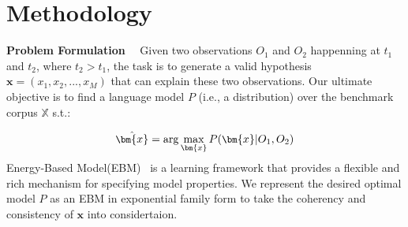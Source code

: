 \section{Methodology}


\noindent \textbf{Problem Formulation} ~~Given two observations $O_1$ and $O_2$ happenning at $t_1$ and $t_2$, where $t_2 > t_1$,
the task is to generate a valid hypothesis $\bm{x} = (x_1, x_2, ..., x_M)$ that can explain these two observations. 
Our ultimate objective is to find a language model $P$ (i.e., a distribution) over the benchmark corpus $\mathbb{X}$ s.t.:

\begin{equation}\label{setting}
    \small
    \hat{\bm{x}} = \arg\max_{\bm{x}}P(\bm{x}|O_1, O_2)
\end{equation}
Energy-Based Model(EBM)~\citep{hintonebm,LeCun06atutorial,DBLP:conf/iclr/DengBOSR20,dpg} is a learning framework
that provides a flexible and rich mechanism for specifying model properties. We represent the desired
optimal model $P$ as an EBM  in exponential family form to take the coherency and consistency of $\bm{x}$ into considertaion.

